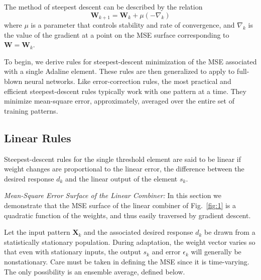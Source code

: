 \documentclass[10pt,twocolumn]{article}
\newcommand{\X}{\bm{X}}
\newcommand{\W}{\bm{W}}
\begin{document}
The method of steepest descent can be described by the relation
\begin{equation}
\W_{k+1} = \W_k + \mu(-\nabla_k) \tag{21}
\end{equation}
where $\mu$ is a parameter that controls stability and rate of convergence, and
$\nabla_k$ is the value of the gradient at a point on the MSE surface corresponding
to $\W = \W_k$.

To begin, we derive rules for steepest-descent minimization of the MSE associated
with a single Adaline element. These rules are then generalized to apply to
full-blown neural networks. Like error-correction rules, the most practical and
efficient steepest-descent rules typically work with one pattern at a time. They
minimize mean-square error, approximately, averaged over the entire set of training
patterns.

\subsection{Linear Rules}
Steepest-descent rules for the single threshold element are said to be linear if
weight changes are proportional to the linear error, the difference between the
desired response $d_k$ and the linear output of the element $s_k$.

\textit{Mean-Square Error Surface of the Linear Combiner:} In this section we
demonstrate that the MSE surface of the linear combiner of Fig.~\ref{fig:1} is a
quadratic function of the weights, and thus easily traversed by gradient descent.

Let the input pattern $\X_k$ and the associated desired response $d_k$ be drawn
from a statistically stationary population. During adaptation, the weight vector
varies so that even with stationary inputs, the output $s_k$ and error $\epsilon_k$
will generally be nonstationary. Care must be taken in defining the MSE since it is
time-varying. The only possibility is an ensemble average, defined below.
\end{document}
